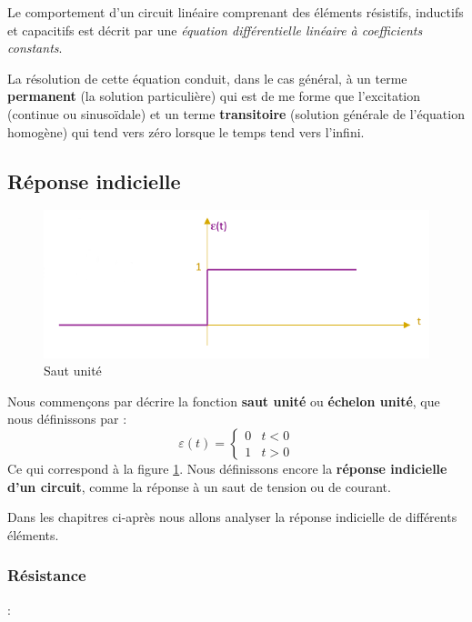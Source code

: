 \documentclass[12pt,a4paper]{article}
\begin{document}
Le comportement d'un circuit linéaire comprenant des éléments résistifs, inductifs et capacitifs est décrit par une \textit{équation différentielle linéaire à coefficients constants}.

La résolution de cette équation conduit, dans le cas général, à un terme \textbf{permanent} (la solution particulière) qui est de me forme que l'excitation (continue ou sinusoïdale) et un terme \textbf{transitoire} (solution générale de l'équation homogène) qui tend vers zéro lorsque le temps tend vers l'infini.

\subsection{Réponse indicielle}
\begin{figure}
	\centering
	\includegraphics[scale=0.5]{images/saut_indiciel}
	\caption{Saut unité}
	\label{fig: saut indiciel}
\end{figure}

Nous commençons par décrire la fonction \textbf{saut unité} ou \textbf{échelon unité}, que nous définissons par :
\begin{equation}
	\varepsilon(t) = \left\{\begin{array}{ll}
		0 & t < 0\\
		1 & t > 0
	\end{array}\right.
\end{equation}
Ce qui correspond à la figure \ref{fig: saut indiciel}. Nous définissons encore la \textbf{réponse indicielle d'un circuit}, comme la réponse à un saut de tension ou de courant.

Dans les chapitres ci-après nous allons analyser la réponse indicielle de différents éléments.
\newpage
\subsubsection{Résistance}
 :
\end{document}
